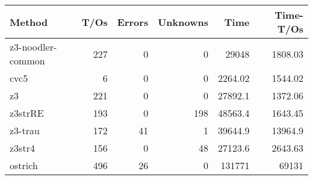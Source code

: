 \begin{tabular}{lrrrrr}
\hline
 Method            &   T/Os &   Errors &   Unknowns &      Time &   Time-T/Os \\
\hline
 z3-noodler-common &    227 &        0 &          0 &  29048    &     1808.03 \\
 cvc5              &      6 &        0 &          0 &   2264.02 &     1544.02 \\
 z3                &    221 &        0 &          0 &  27892.1  &     1372.06 \\
 z3strRE           &    193 &        0 &        198 &  48563.4  &     1643.45 \\
 z3-trau           &    172 &       41 &          1 &  39644.9  &    13964.9  \\
 z3str4            &    156 &        0 &         48 &  27123.6  &     2643.63 \\
 ostrich           &    496 &       26 &          0 & 131771    &    69131    \\
\hline
\end{tabular}
